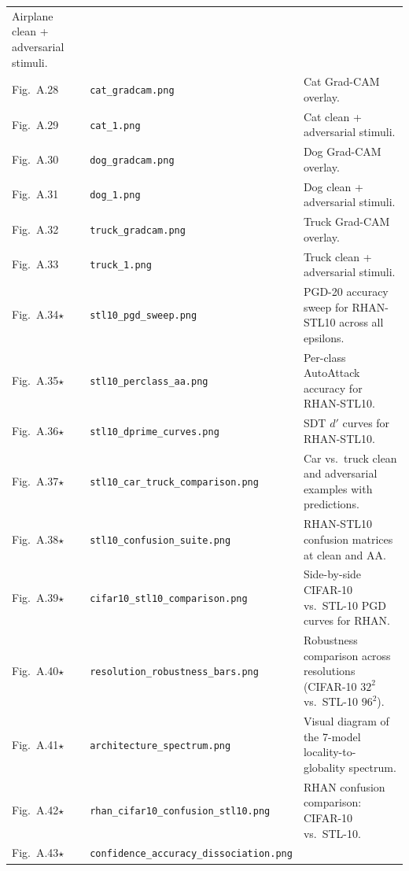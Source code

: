\documentclass[12pt,a4paper]{article}
\begin{document}
\begin{longtable}{>{\raggedright\arraybackslash}p{2.1cm} >{\raggedright\arraybackslash}p{5.2cm} >{\raggedright\arraybackslash}p{\dimexpr\textwidth-2.1cm-5.2cm-4\tabcolsep\relax}}
Airplane clean + adversarial stimuli. \\
Fig.~A.28 & \texttt{cat\_\allowbreak{}gradcam.png} &
Cat Grad-CAM overlay. \\
Fig.~A.29 & \texttt{cat\_\allowbreak{}1.png} &
Cat clean + adversarial stimuli. \\
Fig.~A.30 & \texttt{dog\_\allowbreak{}gradcam.png} &
Dog Grad-CAM overlay. \\
Fig.~A.31 & \texttt{dog\_\allowbreak{}1.png} &
Dog clean + adversarial stimuli. \\
Fig.~A.32 & \texttt{truck\_\allowbreak{}gradcam.png} &
Truck Grad-CAM overlay. \\
Fig.~A.33 & \texttt{truck\_\allowbreak{}1.png} &
Truck clean + adversarial stimuli. \\
\midrule
Fig.~A.34$\star$ & \texttt{stl10\_\allowbreak{}pgd\_\allowbreak{}sweep.png} &
PGD-20 accuracy sweep for RHAN-STL10 across all epsilons. \\
Fig.~A.35$\star$ & \texttt{stl10\_\allowbreak{}perclass\_\allowbreak{}aa.png} &
Per-class AutoAttack accuracy for RHAN-STL10. \\
Fig.~A.36$\star$ & \texttt{stl10\_\allowbreak{}dprime\_\allowbreak{}curves.png} &
SDT $d'$ curves for RHAN-STL10. \\
Fig.~A.37$\star$ & \texttt{stl10\_\allowbreak{}car\_\allowbreak{}truck\_\allowbreak{}comparison.png} &
Car vs.\ truck clean and adversarial examples with predictions. \\
Fig.~A.38$\star$ & \texttt{stl10\_\allowbreak{}confusion\_\allowbreak{}suite.png} &
RHAN-STL10 confusion matrices at clean and AA. \\
Fig.~A.39$\star$ & \texttt{cifar10\_\allowbreak{}stl10\_\allowbreak{}comparison.png} &
Side-by-side CIFAR-10 vs.\ STL-10 PGD curves for RHAN. \\
Fig.~A.40$\star$ & \texttt{resolution\_\allowbreak{}robustness\_\allowbreak{}bars.png} &
Robustness comparison across resolutions (CIFAR-10 $32^2$ vs.\ STL-10 $96^2$). \\
\midrule
Fig.~A.41$\star$ & \texttt{architecture\_\allowbreak{}spectrum.png} &
Visual diagram of the 7-model locality-to-globality spectrum. \\
Fig.~A.42$\star$ & \texttt{rhan\_\allowbreak{}cifar10\_\allowbreak{}confusion\_\allowbreak{}stl10.png} &
RHAN confusion comparison: CIFAR-10 vs.\ STL-10. \\
Fig.~A.43$\star$ & \texttt{confidence\_\allowbreak{}accuracy\_\allowbreak{}dissociation.png} &

\end{longtable}
\end{document}
